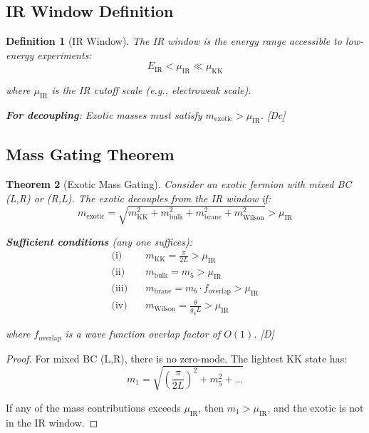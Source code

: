 \documentclass[11pt,a4paper]{article}
\newtheorem{theorem}{Theorem}[section]
\newtheorem{definition}[theorem]{Definition}
\newcommand{\tagD}{\textcolor{blue!70!black}{[D]}}
\newcommand{\tagDc}{\textcolor{blue!50!black}{[Dc]}}
\begin{document}
\subsection{IR Window Definition}

\begin{definition}[IR Window]
\label{def:ir-window}
The IR window is the energy range accessible to low-energy experiments:
\begin{equation}
\label{eq:ir-window}
E_{\text{IR}} < \mu_{\text{IR}} \ll \mu_{\text{KK}}
\end{equation}

where $\mu_{\text{IR}}$ is the IR cutoff scale (e.g., electroweak scale).

\textbf{For decoupling}: Exotic masses must satisfy $m_{\text{exotic}} > \mu_{\text{IR}}$.
\tagDc
\end{definition}

\subsection{Mass Gating Theorem}

\begin{theorem}[Exotic Mass Gating]
\label{thm:mass-gating}
Consider an exotic fermion with mixed BC (L,R) or (R,L). The exotic decouples from the IR window if:
\begin{equation}
\label{eq:gating-condition}
\boxed{m_{\text{exotic}} = \sqrt{m_{\text{KK}}^2 + m_{\text{bulk}}^2 + m_{\text{brane}}^2 + m_{\text{Wilson}}^2} > \mu_{\text{IR}}}
\end{equation}

\textbf{Sufficient conditions} (any one suffices):
\begin{align}
\label{eq:sufficient-1}
\text{(i)} \quad & m_{\text{KK}} = \frac{\pi}{2L} > \mu_{\text{IR}} \\
\label{eq:sufficient-2}
\text{(ii)} \quad & m_{\text{bulk}} = m_5 > \mu_{\text{IR}} \\
\label{eq:sufficient-3}
\text{(iii)} \quad & m_{\text{brane}} = m_b \cdot f_{\text{overlap}} > \mu_{\text{IR}} \\
\label{eq:sufficient-4}
\text{(iv)} \quad & m_{\text{Wilson}} = \frac{\theta}{g_4 L} > \mu_{\text{IR}}
\end{align}

where $f_{\text{overlap}}$ is a wave function overlap factor of $O(1)$.
\tagD
\end{theorem}

\begin{proof}
For mixed BC (L,R), there is no zero-mode. The lightest KK state has:
\begin{equation}
\label{eq:proof-m1}
m_1 = \sqrt{\left(\frac{\pi}{2L}\right)^2 + m_5^2 + \ldots}
\end{equation}

If any of the mass contributions exceeds $\mu_{\text{IR}}$, then $m_1 > \mu_{\text{IR}}$,
and the exotic is not in the IR window.
\end{proof}
\end{document}
